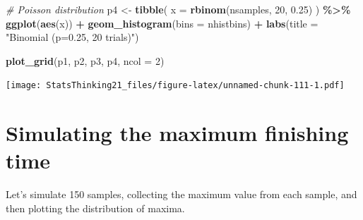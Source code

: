 \documentclass[
  12pt,
]{book}
\newenvironment{Shaded}{\begin{snugshade}}{\end{snugshade}}
\newcommand{\AttributeTok}[1]{\textcolor[rgb]{0.13,0.29,0.53}{#1}}
\newcommand{\CommentTok}[1]{\textcolor[rgb]{0.56,0.35,0.01}{\textit{#1}}}
\newcommand{\DecValTok}[1]{\textcolor[rgb]{0.00,0.00,0.81}{#1}}
\newcommand{\FloatTok}[1]{\textcolor[rgb]{0.00,0.00,0.81}{#1}}
\newcommand{\FunctionTok}[1]{\textcolor[rgb]{0.13,0.29,0.53}{\textbf{#1}}}
\newcommand{\NormalTok}[1]{#1}
\newcommand{\OtherTok}[1]{\textcolor[rgb]{0.56,0.35,0.01}{#1}}
\newcommand{\SpecialCharTok}[1]{\textcolor[rgb]{0.81,0.36,0.00}{\textbf{#1}}}
\newcommand{\StringTok}[1]{\textcolor[rgb]{0.31,0.60,0.02}{#1}}
\begin{document}
\begin{Shaded}
\begin{Highlighting}[]
\CommentTok{\# Poisson distribution}
\NormalTok{p4 }\OtherTok{\textless{}{-}}
  \FunctionTok{tibble}\NormalTok{(}
    \AttributeTok{x =} \FunctionTok{rbinom}\NormalTok{(nsamples, }\DecValTok{20}\NormalTok{, }\FloatTok{0.25}\NormalTok{)}
\NormalTok{  ) }\SpecialCharTok{\%\textgreater{}\%} 
  \FunctionTok{ggplot}\NormalTok{(}\FunctionTok{aes}\NormalTok{(x)) }\SpecialCharTok{+}
  \FunctionTok{geom\_histogram}\NormalTok{(}\AttributeTok{bins =}\NormalTok{ nhistbins) }\SpecialCharTok{+}
  \FunctionTok{labs}\NormalTok{(}\AttributeTok{title =} \StringTok{"Binomial (p=0.25, 20 trials)"}\NormalTok{)}


\FunctionTok{plot\_grid}\NormalTok{(p1, p2, p3, p4, }\AttributeTok{ncol =} \DecValTok{2}\NormalTok{)}
\end{Highlighting}
\end{Shaded}

\texttt{[image: StatsThinking21\_files/figure-latex/unnamed-chunk-111-1.pdf]}

\hypertarget{simulating-the-maximum-finishing-time}{%
\section{Simulating the maximum finishing time}\label{simulating-the-maximum-finishing-time}}

Let's simulate 150 samples, collecting the maximum value from each sample, and then plotting the distribution of maxima.
\end{document}
